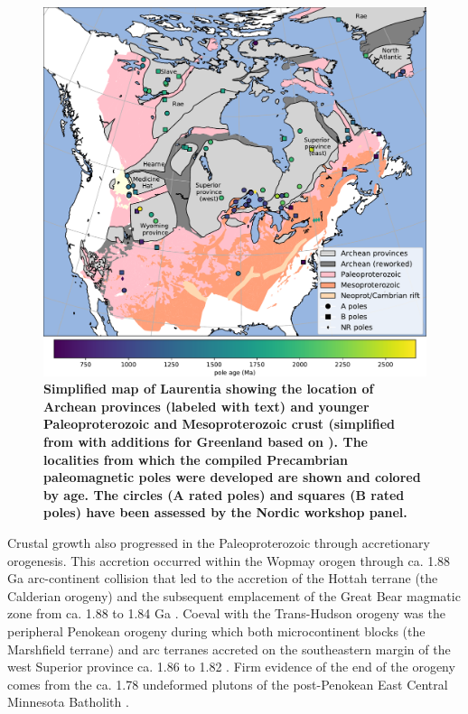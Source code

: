 \documentclass[11pt,letterpaper]{article}
\begin{document}
\begin{figure}
\centering
\includegraphics[width=\textwidth]{../Figures/Fig1_map.pdf}
\caption{\small{\textbf{Simplified map of Laurentia showing the location of Archean provinces (labeled with text) and younger Paleoproterozoic and Mesoproterozoic crust (simplified from \citealp{Whitmeyer2007a} with additions for Greenland based on \citealp{St-Onge2009a}). The localities from which the compiled Precambrian paleomagnetic poles were developed are shown and colored by age. The circles (A rated poles) and squares (B rated poles) have been assessed by the Nordic workshop panel.}}}
\label{fig:Laurentia_map}
\end{figure} 

Crustal growth also progressed in the Paleoproterozoic through accretionary orogenesis. This accretion occurred within the Wopmay orogen through ca. 1.88 Ga arc-continent collision that led to the accretion of the Hottah terrane (the Calderian orogeny) and the subsequent emplacement of the Great Bear magmatic zone from ca. 1.88 to 1.84 Ga \citep{Hildebrand2009a}. Coeval with the Trans-Hudson orogeny was the peripheral Penokean orogeny during which both microcontinent blocks (the Marshfield terrane) and arc terranes accreted on the southeastern margin of the west Superior province ca. 1.86 to 1.82 \citep{Schulz2007a}. Firm evidence of the end of the orogeny comes from the ca. 1.78 undeformed plutons of the post-Penokean East Central Minnesota Batholith \citep{Holm2005a}. 
\end{document}
